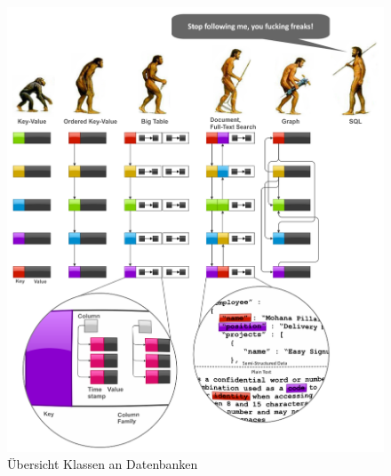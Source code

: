 \begin{figure}
    \centering
    \includegraphics[width=\textwidth]{images/databases-overview.png}
    \caption{Übersicht Klassen an Datenbanken}
    \label{fig:klassen-datenbanken}
\end{figure}

